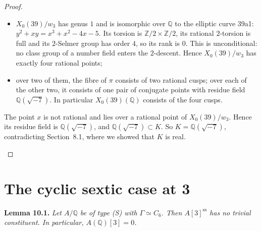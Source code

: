 \documentclass[11pt]{article}
\newcommand{\Q}{\mathbb Q}
\newcommand{\Z}{\mathbb Z}
\begin{document}
\begin{proof}
\begin{enumerate}
\begin{itemize}
\item \(X_0(39)/w_3\) has genus \(1\) and is isomorphic over \(\Q\) to
the elliptic curve 39a1: \(y^2+xy=x^3+x^2-4x-5\). Its torsion is
\(\Z/2\times\Z/2\), its rational \(2\)-torsion is full and its
\(2\)-Selmer group has order \(4\), so its rank is \(0\). This is
unconditional: no class group of a number field enters the
\(2\)-descent. Hence \(X_0(39)/w_3\) has exactly four rational points;
\item over two of them, the fibre of \(\pi\) consists of two rational
cusps; over each of the other two, it consists of one pair of
conjugate points with residue field \(\Q(\sqrt{-7})\). In particular
\(X_0(39)(\Q)\) consists of the four cusps.
\end{itemize}
The point \(x\) is not rational and lies over a rational point of
\(X_0(39)/w_3\). Hence its residue field is \(\Q(\sqrt{-7})\), and
\(\Q(\sqrt{-7})\subset K\). So \(K=\Q(\sqrt{-7})\), contradicting
Section~8.1, where we showed that \(K\) is real.\qedhere
\end{enumerate}
\end{proof}

\section{The cyclic sextic case at 3}

\noindent\textbf{Lemma 10.1.}
\emph{Let \(A/\Q\) be of type (S) with \(\Gamma\simeq C_6\). Then
\(A[3]^{\mathrm{ss}}\) has no trivial constituent. In particular,
\(A(\Q)[3]=0\).}
\end{document}
